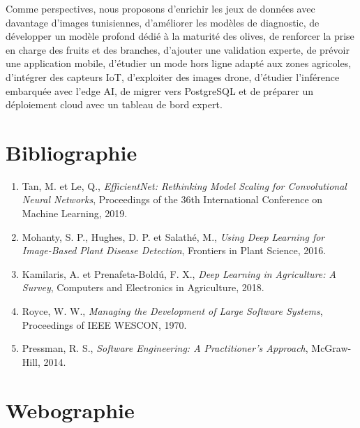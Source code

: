 \documentclass[12pt,a4paper]{report}
\begin{document}
Comme perspectives, nous proposons d'enrichir les jeux de données avec davantage d'images tunisiennes, d'améliorer les modèles de diagnostic, de développer un modèle profond dédié à la maturité des olives, de renforcer la prise en charge des fruits et des branches, d'ajouter une validation experte, de prévoir une application mobile, d'étudier un mode hors ligne adapté aux zones agricoles, d'intégrer des capteurs IoT, d'exploiter des images drone, d'étudier l'inférence embarquée avec l'edge AI, de migrer vers PostgreSQL et de préparer un déploiement cloud avec un tableau de bord expert.

\chapter*{Bibliographie}

\begin{enumerate}
    \item Tan, M. et Le, Q., \textit{EfficientNet: Rethinking Model Scaling for Convolutional Neural Networks}, Proceedings of the 36th International Conference on Machine Learning, 2019.
    \item Mohanty, S. P., Hughes, D. P. et Salathé, M., \textit{Using Deep Learning for Image-Based Plant Disease Detection}, Frontiers in Plant Science, 2016.
    \item Kamilaris, A. et Prenafeta-Boldú, F. X., \textit{Deep Learning in Agriculture: A Survey}, Computers and Electronics in Agriculture, 2018.
    \item Royce, W. W., \textit{Managing the Development of Large Software Systems}, Proceedings of IEEE WESCON, 1970.
    \item Pressman, R. S., \textit{Software Engineering: A Practitioner's Approach}, McGraw-Hill, 2014.
\end{enumerate}

\chapter*{Webographie}
\end{document}
